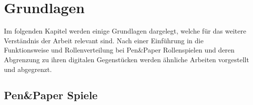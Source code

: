 \chapter{Grundlagen}
\label{background}

Im folgenden Kapitel werden einige Grundlagen dargelegt, welche für das weitere Verständnis der Arbeit relevant sind. Nach einer Einführung in die Funktionsweise und Rollenverteilung bei Pen\&Paper Rollenspielen und deren Abgrenzung zu ihren digitalen Gegenstücken werden ähnliche Arbeiten vorgestellt und abgegrenzt.




\section{Pen\&Paper Spiele}
\label{sec:PenPaperSpiele}



